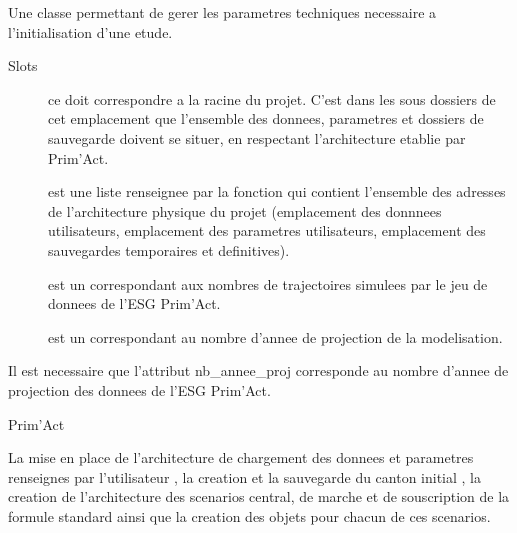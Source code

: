 \documentclass[a4paper]{book}
\begin{document}
%
\begin{Description}\relax
Une classe permettant de gerer les parametres techniques necessaire a l'initialisation d'une etude.
\end{Description}
%
\begin{Section}{Slots}

\begin{description}

\item[] ce  doit correspondre a la racine du projet. C'est dans les sous dossiers de cet emplacement que l'ensemble des donnees, parametres et dossiers de sauvegarde doivent se situer,
en respectant l'architecture etablie par Prim'Act.

\item[] est une liste renseignee par la fonction  qui contient l'ensemble des adresses de l'architecture physique du projet
(emplacement des donnnees utilisateurs, emplacement des parametres utilisateurs, emplacement des sauvegardes temporaires et definitives).

\item[] est un  correspondant aux nombres de trajectoires simulees par le jeu de donnees de l'ESG Prim'Act.

\item[] est un  correspondant au nombre d'annee de projection de la modelisation.

\end{description}
\end{Section}
%
\begin{Note}\relax
Il est necessaire que l'attribut nb\_annee\_proj corresponde au nombre d'annee de projection des donnees de l'ESG Prim'Act.
\end{Note}
%
\begin{Author}\relax
Prim'Act
\end{Author}
%
\begin{SeeAlso}\relax
La mise en place de l'architecture de chargement des donnees et parametres renseignes par l'utilisateur , 
la creation et la sauvegarde du canton initial , la creation de l'architecture des scenarios central, de marche et de souscription 
de la formule standard ainsi que la creation des objets  pour chacun de ces scenarios.
\end{SeeAlso}
\end{document}
